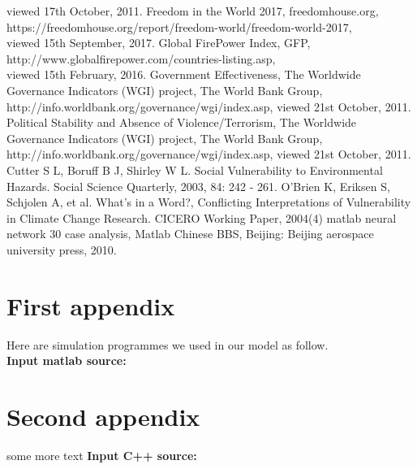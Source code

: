 \documentclass{mcmthesis}
\begin{document}
\begin{thebibliography}{99}
viewed 17th October, 2011.
 Freedom in the World 2017, freedomhouse.org,\\ 
https://freedomhouse.org/report/freedom-world/freedom-world-2017, \\ 
viewed 15th September, 2017.
 Global FirePower Index, GFP,
http://www.globalfirepower.com/countries-listing.asp, \\ 
viewed 15th February, 2016.
 Government Effectiveness, The Worldwide Governance 
Indicators (WGI) project, The World Bank Group, 
http://info.worldbank.org/governance/wgi/index.asp, viewed 21st October, 2011.
 Political Stability and Absence of Violence/Terrorism, 
The Worldwide Governance Indicators (WGI) project, The World Bank Group, \\
http://info.worldbank.org/governance/wgi/index.asp, viewed 21st October, 2011.
 Cutter S L, Boruff B J, Shirley W L. Social 
Vulnerability to Environmental Hazards. Social Science 
Quarterly, 2003, 84: 242 - 261.
 O’Brien K, Eriksen S, Schjolen A, et al. What’s in a Word?, 
Conflicting Interpretations of Vulnerability in Climate Change Research. CICERO Working Paper, 2004(4)
 matlab neural network 30 case analysis, Matlab Chinese BBS, Beijing: Beijing aerospace university press, 2010.
\end{thebibliography}

\begin{appendices}

\section{First appendix}

\lipsum[13]

Here are simulation programmes we used in our model as follow.\\

\textbf{\textcolor[rgb]{0.98,0.00,0.00}{Input matlab source:}}


\section{Second appendix}

some more text \textcolor[rgb]{0.98,0.00,0.00}{\textbf{Input C++ source:}}


\end{appendices}
\end{document}
